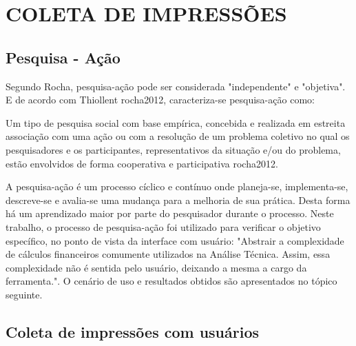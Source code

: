 \section{COLETA DE IMPRESSÕES}
\subsection{Pesquisa - Ação}
Segundo Rocha, pesquisa-ação pode ser considerada "independente" e "objetiva". E de acordo com Thiollent  {rocha2012}, caracteriza-se pesquisa-ação como:
\begin{citacao}
Um tipo de pesquisa social com base empírica, concebida e realizada em estreita associação com uma ação ou com a resolução de um problema coletivo no qual os pesquisadores e os participantes, representativos da situação e/ou do problema, estão envolvidos de forma cooperativa e participativa  {rocha2012}.
\end{citacao}

A pesquisa-ação é um processo cíclico e contínuo onde planeja-se, implementa-se, descreve-se e avalia-se uma mudança para a melhoria de sua prática. Desta forma há um aprendizado maior por parte do pesquisador durante o processo. Neste trabalho, o processo de pesquisa-ação foi utilizado para verificar o objetivo específico, no ponto de vista da interface com usuário: "Abstrair a complexidade de cálculos financeiros comumente utilizados na Análise Técnica. Assim, essa complexidade não é sentida pelo usuário, deixando a mesma a cargo da ferramenta.". O cenário de uso e resultados obtidos são apresentados no tópico seguinte.


\subsection{Coleta de impressões com usuários}

